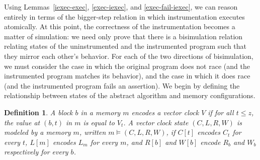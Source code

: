 \documentclass[preprint, 10pt]{sigplanconf}
\newtheorem{definition}{Definition}
\begin{document}
Using Lemmas~\ref{iexec-exec}, \ref{exec-iexec}, and \ref{exec-fail-iexec}, we can reason entirely in terms of the bigger-step relation in which instrumentation executes atomically. At this point, the correctness of the instrumentation becomes a matter of simulation: we need only prove that there is a bisimulation relation relating states of the uninstrumented and the instrumented program such that they mirror each other's behavior. For each of the two directions of bisimulation, we must consider the case in which the original program does not race (and the instrumented program matches its behavior), and the case in which it does race (and the instrumented program fails an assertion). We begin by defining the relationship between states of the abstract algorithm and memory configurations.
\begin{definition}A block $b$ in a memory $m$ encodes a vector clock $V$ if for all $t \le z$, the value at $(b, t)$ in $m$ is equal to $V_t$. A vector clock state $(C, L, R, W)$ is modeled by a memory $m$, written $m \models (C, L, R, W)$, if $C[t]$ encodes $C_t$ for every $t$, $L[m]$ encodes $L_m$ for every $m$, and $R[b]$ and $W[b]$ encode $R_b$ and $W_b$ respectively for every $b$.\end{definition}
\end{document}
